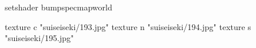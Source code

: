 setshader bumpspecmapworld

    texture c "suiseiseki/193.jpg"
    texture n "suiseiseki/194.jpg"
    texture s "suiseiseki/195.jpg"
